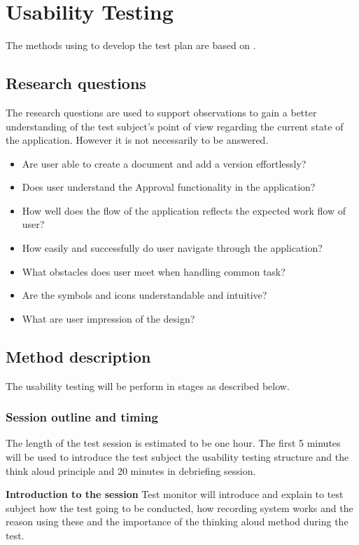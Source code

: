 \chapter{Usability Testing} \label{bilag:utestbilag}
The methods using to develop the test plan are based on \citep[p.~65-91]{HandbookofUsabilityTesting}. 

\section{Research questions}
The research questions are used to support observations to gain a better understanding of the test subject's point of view regarding the current state of the application. 
However it is not necessarily to be answered.

\begin{itemize}
	\item Are user able to create a document and add a version effortlessly?
	\item Does user understand the Approval functionality in the application?
	\item How well does the flow of the application reflects the expected work flow of user?
	\item How easily and successfully do user navigate through the application? 
	\item What obstacles does user meet when handling common task?
	\item Are the symbols and icons understandable and intuitive? 
	\item What are user impression of the design?
\end{itemize}

\section{Method description}
The usability testing will be perform in stages as described below.

\subsection{Session outline and timing}
The length of the test session is estimated to be one hour. The first 5 minutes will be used to introduce the test subject the usability testing structure and the think aloud principle and 20 minutes in debriefing session. 

\textbf{Introduction to the session}
Test monitor will introduce and explain to test subject how the test going to be conducted, how recording system works and the reason using these and the importance of the thinking aloud method during the test. 

